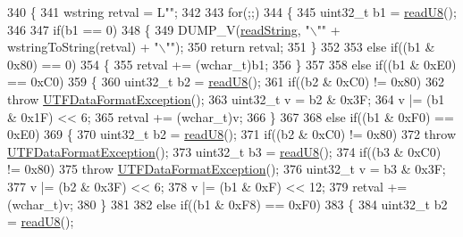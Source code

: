 \begin{DoxyCode}
340         \{
341             wstring retval = L\textcolor{stringliteral}{""};
342 
343             \textcolor{keywordflow}{for}(;;)
344             \{
345                 uint32\_t b1 = \hyperlink{classReader_a32e2703dfc40dd59216b648a0cf7ce2c}{readU8}();
346 
347                 \textcolor{keywordflow}{if}(b1 == 0)
348                 \{
349                     DUMP\_V(\hyperlink{classReader_a4c128181d159e7581b89aa796a8de7ab}{readString}, \textcolor{stringliteral}{"\(\backslash\)""} + wstringToString(retval) + \textcolor{stringliteral}{"\(\backslash\)""});
350                     \textcolor{keywordflow}{return} retval;
351                 \}
352 
353                 \textcolor{keywordflow}{else} \textcolor{keywordflow}{if}((b1 & 0x80) == 0)
354                 \{
355                     retval += (wchar\_t)b1;
356                 \}
357 
358                 \textcolor{keywordflow}{else} \textcolor{keywordflow}{if}((b1 & 0xE0) == 0xC0)
359                 \{
360                     uint32\_t b2 = \hyperlink{classReader_a32e2703dfc40dd59216b648a0cf7ce2c}{readU8}();
361                     \textcolor{keywordflow}{if}((b2 & 0xC0) != 0x80)
362                         \textcolor{keywordflow}{throw} \hyperlink{classUTFDataFormatException}{UTFDataFormatException}();
363                     uint32\_t v = b2 & 0x3F;
364                     v |= (b1 & 0x1F) << 6;
365                     retval += (wchar\_t)v;
366                 \}
367 
368                 \textcolor{keywordflow}{else} \textcolor{keywordflow}{if}((b1 & 0xF0) == 0xE0)
369                 \{
370                     uint32\_t b2 = \hyperlink{classReader_a32e2703dfc40dd59216b648a0cf7ce2c}{readU8}();
371                     \textcolor{keywordflow}{if}((b2 & 0xC0) != 0x80)
372                         \textcolor{keywordflow}{throw} \hyperlink{classUTFDataFormatException}{UTFDataFormatException}();
373                     uint32\_t b3 = \hyperlink{classReader_a32e2703dfc40dd59216b648a0cf7ce2c}{readU8}();
374                     \textcolor{keywordflow}{if}((b3 & 0xC0) != 0x80)
375                         \textcolor{keywordflow}{throw} \hyperlink{classUTFDataFormatException}{UTFDataFormatException}();
376                     uint32\_t v = b3 & 0x3F;
377                     v |= (b2 & 0x3F) << 6;
378                     v |= (b1 & 0xF) << 12;
379                     retval += (wchar\_t)v;
380                 \}
381 
382                 \textcolor{keywordflow}{else} \textcolor{keywordflow}{if}((b1 & 0xF8) == 0xF0)
383                 \{
384                     uint32\_t b2 = \hyperlink{classReader_a32e2703dfc40dd59216b648a0cf7ce2c}{readU8}();

\end{DoxyCode}
